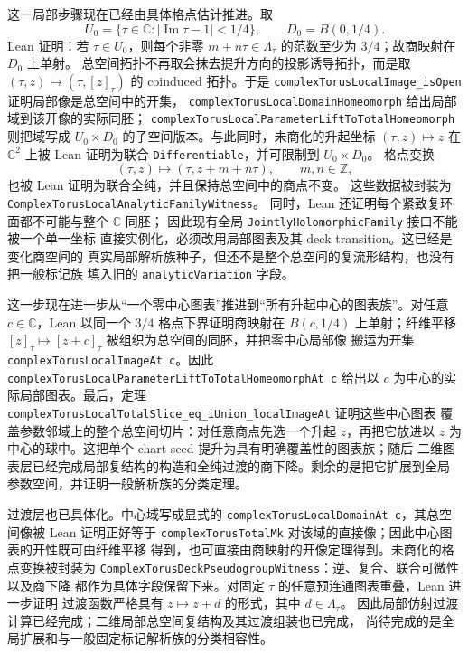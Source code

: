 \documentclass[UTF8,fontset=none,a4paper,11pt]{ctexart}
\begin{document}
这一局部步骤现在已经由具体格点估计推进。取
\[
  U_0=\{\tau\in\mathbb C:\lvert\operatorname{Im}\tau-1\rvert<1/4\},
  \qquad D_0=B(0,1/4).
\]
Lean 证明：若 \(\tau\in U_0\)，则每个非零
\(m+n\tau\in\Lambda_\tau\) 的范数至少为 \(3/4\)；故商映射在 \(D_0\) 上单射。
总空间拓扑不再取会抹去提升方向的投影诱导拓扑，而是取
\((\tau,z)\mapsto(\tau,[z]_\tau)\) 的 coinduced 拓扑。于是
\texttt{complexTorusLocalImage\_isOpen} 证明局部像是总空间中的开集，
\texttt{complexTorusLocalDomainHomeomorph} 给出局部域到该开像的实际同胚；
\texttt{complexTorusLocalParameterLiftToTotalHomeomorph} 则把域写成
\(U_0\times D_0\) 的子空间版本。与此同时，未商化的升起坐标
\((\tau,z)\mapsto z\) 在 \(\mathbb C^2\) 上被 Lean 证明为联合
\texttt{Differentiable}，并可限制到 \(U_0\times D_0\)。
格点变换
\enlargethispage{3\baselineskip}
\[
  (\tau,z)\longmapsto(\tau,z+m+n\tau),\qquad m,n\in\mathbb Z,
\]
也被 Lean 证明为联合全纯，并且保持总空间中的商点不变。
这些数据被封装为\linebreak
\texttt{ComplexTorusLocalAnalyticFamily\allowbreak Witness}。
同时，Lean 还证明每个紧致复环面都不可能与整个 \(\mathbb C\) 同胚；
因此现有全局 \texttt{JointlyHolomorphicFamily} 接口不能被一个单一坐标
直接实例化，必须改用局部图表及其 deck transition。这已经是变化商空间的
真实局部解析族种子，但还不是整个总空间的复流形结构，也没有把一般标记族
填入旧的 \texttt{analyticVariation} 字段。

这一步现在进一步从“一个零中心图表”推进到“所有升起中心的图表族”。对任意
\(c\in\mathbb C\)，Lean 以同一个 \(3/4\) 格点下界证明商映射在
\(B(c,1/4)\) 上单射；纤维平移
\( [z]_{\tau}\mapsto[z+c]_{\tau} \) 被组织为总空间的同胚，并把零中心局部像
搬运为开集 \texttt{complexTorusLocalImageAt c}。因此
\texttt{complexTorusLocalParameterLiftToTotalHomeomorphAt c} 给出以 \(c\)
为中心的实际局部图表。最后，定理
\texttt{complexTorusLocalTotalSlice\_eq\_iUnion\_localImageAt} 证明这些中心图表
覆盖参数邻域上的整个总空间切片：对任意商点先选一个升起 \(z\)，再把它放进以
\(z\) 为中心的球中。这把单个 chart seed 提升为具有明确覆盖性的图表族；随后
二维图表层已经完成局部复结构的构造和全纯过渡的商下降。剩余的是把它扩展到全局
参数空间，并证明一般解析族的分类定理。

过渡层也已具体化。中心域写成显式的
\texttt{complexTorusLocalDomainAt c}，其总空间像被 Lean 证明正好等于
\texttt{complexTorusTotalMk} 对该域的直接像；因此中心图表的开性既可由纤维平移
得到，也可直接由商映射的开像定理得到。未商化的格点变换被封装为
\texttt{ComplexTorusDeckPseudogroupWitness}：逆、复合、联合可微性以及商下降
都作为具体字段保留下来。对固定 \(\tau\) 的任意预连通图表重叠，Lean 进一步证明
过渡函数严格具有 \(z\mapsto z+d\) 的形式，其中 \(d\in\Lambda_\tau\)。
因此局部仿射过渡计算已经完成；二维局部总空间复结构及其过渡组装也已完成，
尚待完成的是全局扩展和与一般固定标记解析族的分类相容性。
\end{document}
